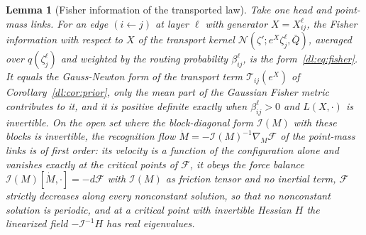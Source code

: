 \documentclass[11pt]{article}
\newtheorem{lemma}[theorem]{Lemma}
\theoremstyle{definition}
\theoremstyle{remark}
\newcommand{\N}{\mathcal N}
\newcommand{\Qb}{\bar Q}
\begin{document}
\begin{lemma}[Fisher information of the transported law]
\label{dl:lem:fisher}
Take one head and point-mass links. For an edge $(i\leftarrow j)$ at layer $\ell$ with generator $X=X_{ij}^\ell$, the Fisher information with respect to $X$ of the transport kernel $\N(\zeta';e^X\zeta_j^\ell,\Qb)$, averaged over $q(\zeta_j^\ell)$ and weighted by the routing probability $\beta_{ij}^\ell$, is the form~\eqref{dl:eq:fisher}. It equals the Gauss-Newton form of the transport term $\mathcal T_{ij}(e^X)$ of Corollary~\ref{dl:cor:prior}, only the mean part of the Gaussian Fisher metric contributes to it, and it is positive definite exactly when $\beta_{ij}^\ell>0$ and $L(X,\cdot)$ is invertible. On the open set where the block-diagonal form $\mathcal I(M)$ with these blocks is invertible, the recognition flow $\dot M=-\mathcal I(M)^{-1}\nabla_M\mathcal F$ of the point-mass links is of first order: its velocity is a function of the configuration alone and vanishes exactly at the critical points of $\mathcal F$, it obeys the force balance $\mathcal I(M)[\dot M,\cdot]=-d\mathcal F$ with $\mathcal I(M)$ as friction tensor and no inertial term, $\mathcal F$ strictly decreases along every nonconstant solution, so that no nonconstant solution is periodic, and at a critical point with invertible Hessian $H$ the linearized field $-\mathcal I^{-1}H$ has real eigenvalues.
\end{lemma}
\end{document}
